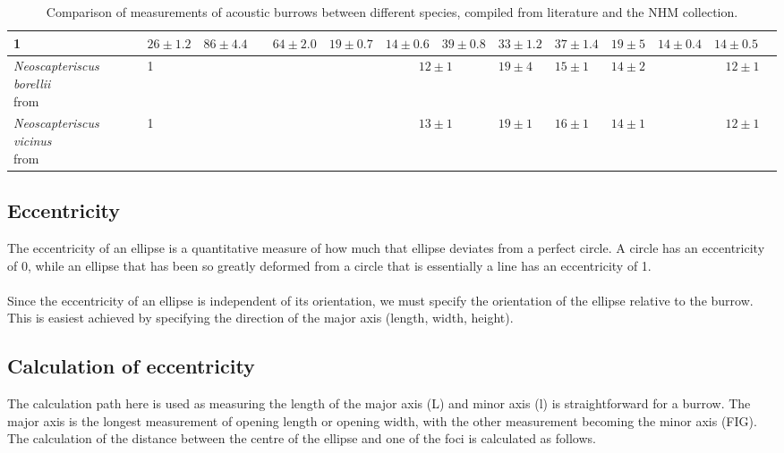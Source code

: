 \documentclass{article}
\begin{document}
\begin{landscape}
\begin{table}
\begin{tabular}{|l|l|l|l|l|l|l|l|l|l|l|l|l|l|}
		   			1 &
		   			$26\pm1.2$ &
		   			$86\pm4.4$ &
		   			&
		   			$64\pm2.0$ &
		   			$19\pm0.7$ &
		   			$14\pm0.6$ &
		   			$39\pm0.8$ &
		   			$33\pm1.2$ &
		   			$37\pm1.4$ &
		   			$19\pm5$ &
		   			$14\pm0.4$ &
		   			$14\pm0.5$ \\
		   	\hline 	\makecell{\textit{Neoscapteriscus borellii}\\from \cite{nickerson1979}} &
				   	1 &
				   	&
				   	&
				   	&
				   	&
				   	\multicolumn{2}{c|}{$12\pm1$} &
				   	$19\pm4$ &
				   	$15\pm1$ &
				   	$14\pm2$ &
				   	&
				   	\multicolumn{2}{c|}{$12\pm1$} \\
			\hline 	\makecell{\textit{Neoscapteriscus vicinus}\\from \cite{nickerson1979}} &
					1 &
					&
					&
					&
					&
					\multicolumn{2}{c|}{$13\pm1$} &
					$19\pm1$ &
					$16\pm1$ &
					$14\pm1$ &
					&
					\multicolumn{2}{c|}{$12\pm1$} \\	
   			\hline
   		
   		\end{tabular} 
   		\caption{Comparison of measurements of acoustic burrows between different species, compiled from literature and the NHM collection.}
   		\label{tab:comparisons}
   	\end{table}
   \end{landscape}
   \subsection{Eccentricity}
   The eccentricity of an ellipse is a quantitative measure of how much that ellipse deviates from a perfect circle. A circle has an eccentricity of 0, while an ellipse that has been so greatly deformed from a circle that is essentially a line has an eccentricity of 1.
   
   \paragraph{}
   Since the eccentricity of an ellipse is independent of its orientation, we must specify the orientation of the ellipse relative to the burrow. This is easiest achieved by specifying the direction of the major axis (length, width, height).
   
      
   \subsection{Calculation of eccentricity}
   The calculation path here is used as measuring the length of the major axis (L) and minor axis (l) is straightforward for a burrow. The major axis is the longest measurement of opening length or opening width, with the other measurement becoming the minor axis (FIG). The calculation of the distance between the centre of the ellipse and one of the foci is calculated as follows.
   
\end{document}
